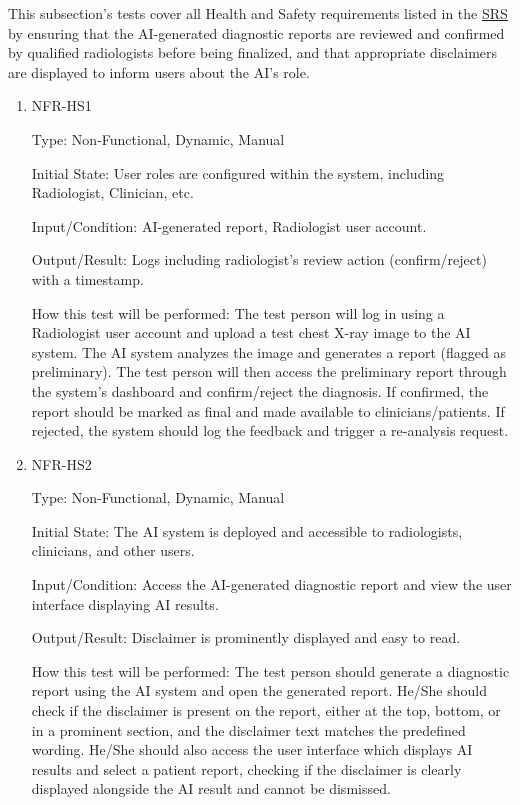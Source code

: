 \documentclass[12pt, titlepage]{article}
\begin{document}
This subsection's tests cover all Health and Safety requirements listed in the \href{https://github.com/RezaJodeiri/CXR-Capstone/blob/main/docs/SRS/SRS.pdf}{SRS} \citep{SRS}
 by ensuring that the AI-generated diagnostic reports are reviewed and confirmed by qualified radiologists before being finalized, and that appropriate disclaimers are displayed to inform users about the AI's role.

\begin{enumerate}

\item{NFR-HS1\\}\label{NFR-HS1}

Type: Non-Functional, Dynamic, Manual

Initial State: User roles are configured within the system, including Radiologist, Clinician, etc.

Input/Condition: AI-generated report, Radiologist user account.

Output/Result: Logs including radiologist's review action (confirm/reject) with a timestamp.

How this test will be performed: The test person will log in using a Radiologist user account and upload a test chest X-ray image to the AI system. The AI system analyzes the image and generates a report (flagged as preliminary). The test person will then access the preliminary report through the system's dashboard and confirm/reject the diagnosis. If confirmed, the report should be marked as final and made available to clinicians/patients. If rejected, the system should log the feedback and trigger a re-analysis request.

\item{NFR-HS2\\}\label{NFR-HS2}

Type: Non-Functional, Dynamic, Manual

Initial State: The AI system is deployed and accessible to radiologists, clinicians, and other users.

Input/Condition: Access the AI-generated diagnostic report and view the user interface displaying AI results.

Output/Result: Disclaimer is prominently displayed and easy to read.

How this test will be performed: The test person should generate a diagnostic report using the AI system and open the generated report. He/She should check if the disclaimer is present on the report, either at the top, bottom, or in a prominent section, and the disclaimer text matches the predefined wording. He/She should also access the user interface which displays AI results and select a patient report, checking if the disclaimer is clearly displayed alongside the AI result and cannot be dismissed.

\end{enumerate}
\end{document}
